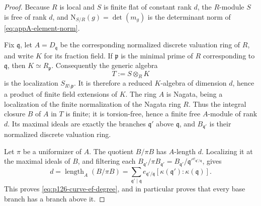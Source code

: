 \begin{proof}
Because \(R\) is local and \(S\) is finite flat of constant rank \(d\),
the \(R\)-module \(S\) is free of rank \(d\), and
\(\mathrm N_{S/R}(g)=\det(m_g)\) is the determinant norm of
\eqref{eq:appA-element-norm}.

Fix \(\mathfrak q\), let \(A=D_{\mathfrak q}\) be the corresponding
normalized discrete valuation ring of \(R\), and write \(K\) for its
fraction field.  If \(\mathfrak p\) is the minimal prime of \(R\)
corresponding to \(\mathfrak q\), then \(K\simeq R_{\mathfrak p}\).
Consequently the generic algebra
\[
                          T:=S\otimes_RK
\]
is the localization \(S_{R\setminus\mathfrak p}\).  It is therefore a
reduced \(K\)-algebra of dimension \(d\), hence a product of finite field
extensions of \(K\).  The ring \(A\) is Nagata, being a localization of the
finite normalization of the Nagata ring \(R\).  Thus the integral closure
\(B\) of \(A\) in \(T\) is finite; it is torsion-free, hence a finite free
\(A\)-module of rank \(d\).  Its maximal ideals are exactly the branches
\(\mathfrak q'\) above \(\mathfrak q\), and
\(B_{\mathfrak q'}\) is their normalized discrete valuation ring.

Let \(\pi\) be a uniformizer of \(A\).  The quotient \(B/\pi B\) has
\(A\)-length \(d\).  Localizing it at the maximal ideals of \(B\), and
filtering each
\(B_{\mathfrak q'}/\pi B_{\mathfrak q'}
 =B_{\mathfrak q'}/\mathfrak q'^{e_{\mathfrak q'/\mathfrak q}}\),
gives
\[
 d=\operatorname{length}_A(B/\pi B)
   =\sum_{\mathfrak q'\mid\mathfrak q}
      e_{\mathfrak q'/\mathfrak q}
      [\kappa(\mathfrak q'): \kappa(\mathfrak q)].
\]
This proves \eqref{eq:p126-curve-ef-degree}, and in particular proves that
every base branch has a branch above it.


\end{proof}
